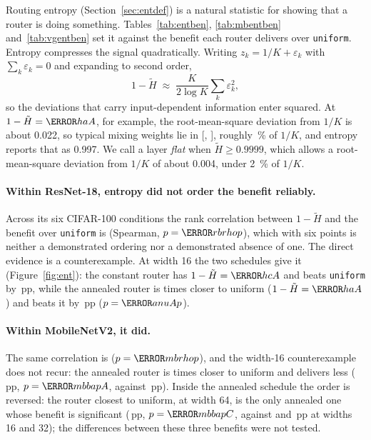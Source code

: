 \documentclass[10pt,a4paper]{article}
\begin{document}
Routing entropy (Section~\ref{sec:entdef}) is a natural statistic for
showing that a router is doing something.
Tables~\ref{tab:entben}, \ref{tab:mbentben} and~\ref{tab:vgentben} set it
against the benefit each router delivers over \texttt{uniform}. Entropy compresses the signal
quadratically. Writing $z_k=1/K+\varepsilon_k$ with
$\sum_k\varepsilon_k=0$ and expanding to second order,
\begin{equation}
1-\tilde H\;\approx\;\frac{K}{2\log K}\sum_k\varepsilon_k^{2},
\label{eq:ent}
\end{equation}
so the deviations that carry input-dependent information enter squared.
At $1-\tilde H=\V{haA}$, for example, the root-mean-square deviation from
$1/K$ is about 0.022, so typical mixing weights lie in
[, ], roughly \,\% of $1/K$, and entropy
reports that as 0.997. We call a layer \emph{flat} when
$\tilde H\ge0.9999$, which allows a root-mean-square deviation from $1/K$
of about 0.004, under \SI{2}{\percent} of $1/K$.

\paragraph{Within ResNet-18, entropy did not order the benefit reliably.}
Across its six CIFAR-100 conditions the rank correlation between
$1-\tilde H$ and the benefit over \texttt{uniform} is  (Spearman,
$p=\V{rbrhop}$), which with six points is neither a demonstrated ordering
nor a demonstrated absence of one. The direct evidence is a counterexample.
At width 16 the two schedules give it
(Figure~\ref{fig:ent}): the constant router has $1-\tilde H=\V{hcA}$ and
beats \texttt{uniform} by \,pp, while the annealed router is
 times closer to uniform ($1-\tilde H=\V{haA}$) and beats it by
\,pp ($p=\V{anuAp}$).

\paragraph{Within MobileNetV2, it did.} The same correlation is
 ($p=\V{mbrhop}$), and the width-16 counterexample does not recur:
the annealed router is  times closer to uniform and delivers less
(\,pp, $p=\V{mbbapA}$, against \,pp). Inside the annealed
schedule the order is reversed: the router closest to uniform, at width
64, is the only annealed one whose benefit is significant (\,pp,
$p=\V{mbbapC}$, against  and \,pp at widths 16 and 32);
the differences between these three benefits were not tested.
\end{document}
